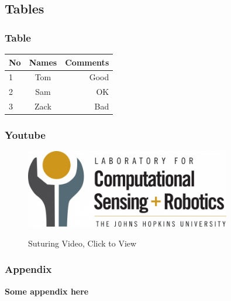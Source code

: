 \documentclass[12pt]{beamer}
\begin{document}
\subsection{Tables}

\begin{frame}
  \frametitle{Table}
  \begin{tabular}{|l|c|r|}
    \textbf{No} & \textbf{Names} & \textbf{Comments}  \\
    \hline
    1 & Tom & Good  \\
    2 & Sam & OK    \\ 
    3 & Zack & Bad \\
  \end{tabular}
\end{frame}



\begin{frame}
  \frametitle{Youtube}
  \begin{figure}
    \href{https://www.youtube.com/watch?v=_OBlgSz8sSM}
    {\includegraphics[width=0.8\textwidth]{figs/logo-LCSR-800px.jpg}}
    \caption{Suturing Video, Click to View}
  \end{figure}

  
\end{frame}







\appendix

\begin{frame}
  \frametitle{Appendix}
  \textbf{Some appendix here}
\end{frame}
\end{document}
